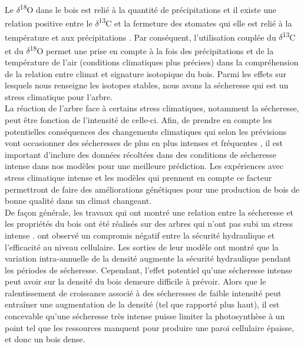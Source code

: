 \documentclass[a4paper,12pt]{report}
\newcommand{\Ctreize}{$\delta$\textsuperscript{13}C\xspace}
\newcommand{\Odixhuit}{$\delta$\textsuperscript{18}O\xspace}
\begin{document}
Le \Odixhuit dans le bois est relié à la quantité de précipitations \citep{Bonal2000} et il existe une relation positive entre le \Ctreize et la fermeture des stomates qui elle est relié à la température et aux précipitations \citep{Pons2011}. Par conséquent, l'utilisation couplée du \Ctreize et du \Odixhuit permet une prise en compte à la fois des précipitations et de la température de l'air (conditions climatiques plus précises) dans la compréhension de la relation entre climat et signature isotopique du bois. Parmi les effets sur lesquels nous renseigne les isotopes stables, nous avons la sécheresse qui est un stress climatique pour l'arbre.\\ 

La réaction de l'arbre face à certains stress climatiques, notamment la sécheresse, peut être fonction de l'intensité de celle-ci. Afin, de prendre en compte les potentielles conséquences des changements climatiques qui selon les prévisions vont occasionner des sécheresses de plus en plus intenses et fréquentes \citep{IPCC_2015}, il est important d'inclure des données récoltées dans des conditions de sécheresse intense dans nos modèles pour une meilleure prédiction. Les expériences avec stress climatique intense et les modèles qui prennent en compte ce facteur permettront de faire des améliorations génétiques pour une production de bois de bonne qualité dans un climat changeant.\\

De façon générale, les travaux qui ont montré une relation entre la sécheresse et les propriétés du bois ont été réalisés sur des arbres qui n'ont pas subi un stress intense \citep{Xu2012,Drew2009,Campelo2013,Jyske2009,Wilkinson2015}. \cite{Wilkinson2015} ont observé un compromis négatif entre la sécurité hydraulique et l'efficacité au niveau cellulaire. Les sorties de leur modèle ont montré que la variation intra-annuelle de la densité augmente la sécurité hydraulique pendant les périodes de sécheresse. Cependant, l'effet potentiel qu'une sécheresse intense peut avoir sur la densité du bois demeure difficile à prévoir. Alors que le ralentissement de croissance associé à des sécheresses de faible intensité peut entraîner une augmentation de la densité (tel que rapporté plus haut), il est concevable qu'une sécheresse très intense puisse limiter la photosynthèse à un point tel que les ressources manquent pour produire une paroi cellulaire épaisse, et donc un bois dense.\\ 
\end{document}
